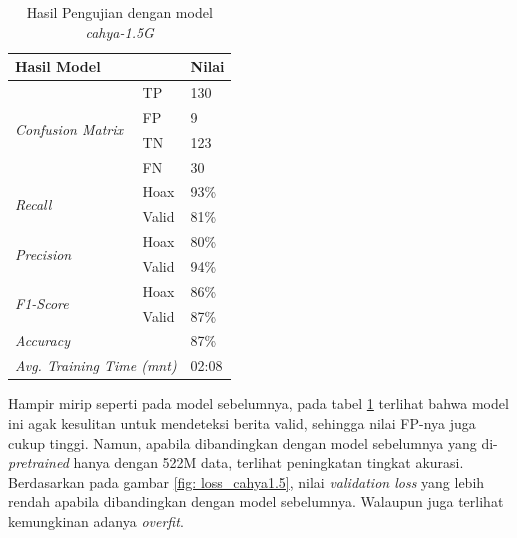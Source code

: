 \begin{table}[h]
    \caption{Hasil Pengujian dengan model \textit{cahya-1.5G}}
    \label{tab: loss_cahya1.5}
    \centering
    \begin{tabular}{|l|l|l|}
        \hline
        \multicolumn{2}{|l|}{\textbf{Hasil Model}}              & \textbf{Nilai}        \\ \hline
        \multirow{4}{*}{\textit{Confusion Matrix}}              & TP             & 130  \\ \cline{2-3}
                                                                & FP             & 9    \\ \cline{2-3}
                                                                & TN             & 123  \\ \cline{2-3}
                                                                & FN             & 30   \\ \hline
        \multirow{2}{*}{\textit{Recall}}                        & Hoax           & 93\% \\ \cline{2-3}
                                                                & Valid          & 81\% \\ \hline
        \multirow{2}{*}{\textit{Precision}}                     & Hoax           & 80\% \\ \cline{2-3}
                                                                & Valid          & 94\% \\ \hline
        \multirow{2}{*}{\textit{F1-Score}}                      & Hoax           & 86\% \\ \cline{2-3}
                                                                & Valid          & 87\% \\ \hline
        \multicolumn{2}{|l|}{\textit{Accuracy}}                 & 87\%                  \\ \hline
        \multicolumn{2}{|l|}{\textit{Avg. Training Time (mnt)}} & 02:08                 \\ \hline
    \end{tabular}
\end{table}

Hampir mirip seperti pada model sebelumnya, pada tabel \ref{tab: loss_cahya1.5} terlihat bahwa model ini agak kesulitan untuk mendeteksi berita valid, sehingga nilai FP-nya juga cukup tinggi. Namun, apabila dibandingkan dengan model sebelumnya yang di-\textit{pretrained} hanya dengan 522M data, terlihat peningkatan tingkat akurasi. Berdasarkan pada gambar \ref{fig: loss_cahya1.5}, nilai \textit{validation loss} yang lebih rendah apabila dibandingkan dengan model sebelumnya. Walaupun juga terlihat kemungkinan adanya \textit{overfit}.

